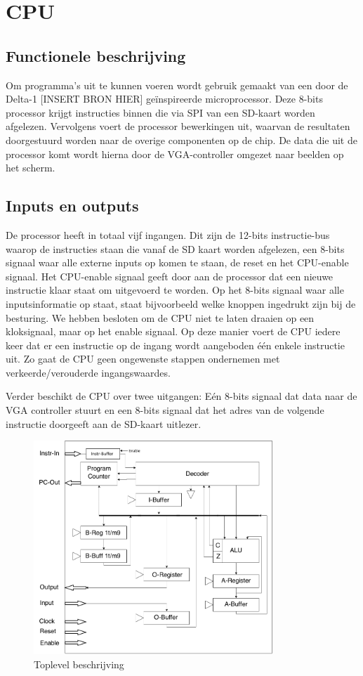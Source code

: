 \documentclass[oneside,dutch]{tudelft-report}
\begin{document}
\newpage

\chapter{CPU}
\section{Functionele beschrijving}
Om programma’s uit te kunnen voeren wordt gebruik gemaakt van een door de Delta-1 [INSERT BRON HIER] geïnspireerde microprocessor. Deze 8-bits processor krijgt instructies binnen die via SPI van een SD-kaart worden afgelezen. Vervolgens voert de processor bewerkingen uit, waarvan de resultaten doorgestuurd worden naar de overige componenten op de chip. De data die uit de processor komt wordt hierna door de VGA-controller omgezet naar beelden op het scherm.



\section{Inputs en outputs}
De processor heeft in totaal vijf ingangen. Dit zijn de 12-bits instructie-bus waarop de instructies staan die vanaf de SD kaart worden afgelezen, een 8-bits signaal waar alle externe inputs op komen te staan, de reset en het CPU-enable signaal. Het CPU-enable signaal geeft door aan de processor dat een nieuwe instructie klaar staat om uitgevoerd te worden. Op het 8-bits signaal waar alle inputsinformatie op staat, staat bijvoorbeeld welke knoppen ingedrukt zijn bij de besturing.
We hebben besloten om de CPU niet te laten draaien op een kloksignaal, maar op het enable signaal. Op deze manier voert de CPU iedere keer dat er een instructie op de ingang wordt aangeboden één enkele instructie uit. Zo gaat de CPU geen ongewenste stappen ondernemen met verkeerde/verouderde ingangswaardes. 

Verder beschikt de CPU over twee uitgangen: Eén 8-bits signaal dat data naar de VGA controller stuurt en een 8-bits signaal dat het adres van de volgende instructie doorgeeft aan de SD-kaart uitlezer. 

\begin{figure}[H]
\center
\includegraphics[width=9cm]{CPU-toplevel2}
\caption{Toplevel beschrijving}
\label{CPU}
\end{figure}
\end{document}
